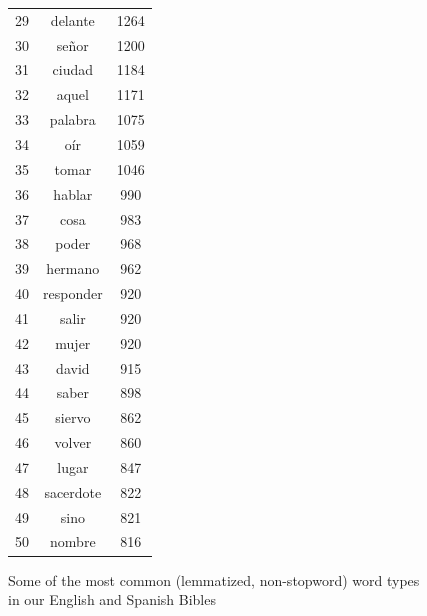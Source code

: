 \begin{figure}
\begin{tiny}
\begin{centering}
\begin{tabular}{|r|c|c|}
29 & delante & 1264 \\
30 & señor & 1200 \\
31 & ciudad & 1184 \\
32 & aquel & 1171 \\
33 & palabra & 1075 \\
34 & oír & 1059 \\
35 & tomar & 1046 \\
36 & hablar & 990 \\
37 & cosa & 983 \\
38 & poder & 968 \\
39 & hermano & 962 \\
40 & responder & 920 \\
41 & salir & 920 \\
42 & mujer & 920 \\
43 & david & 915 \\
44 & saber & 898 \\
45 & siervo & 862 \\
46 & volver & 860 \\
47 & lugar & 847 \\
48 & sacerdote & 822 \\
49 & sino & 821 \\
50 & nombre & 816 \\
    \hline
  \end{tabular}
  \end{centering}
  \end{tiny}
  \caption{Some of the most common (lemmatized, non-stopword) word types in our
  English and Spanish Bibles}
  \label{fig:mostcommon-en-es}
\end{figure}

